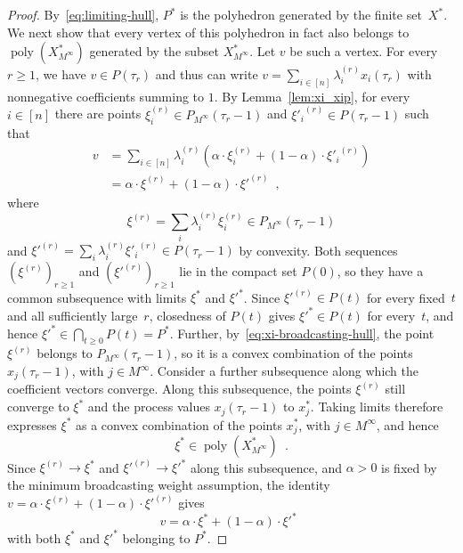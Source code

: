 \documentclass[preprint,12pt,a4paper]{elsarticle}
\theoremstyle{plain}
\theoremstyle{definition}
\renewcommand{\geq}{\geqslant}
\DeclareMathOperator\poly{poly}
\begin{document}
\begin{proof}
\medskip

By~\eqref{eq:limiting-hull}, $P^*$ is the polyhedron generated by
  the finite set~$X^*$.
We next show that every vertex of this polyhedron in fact also belongs to
  $\poly(X_{M^\infty}^*)$ generated by the subset $X_{M^\infty}^*$.
Let $v$ be such a vertex.
For every $r \geq 1$, we have $v \in P(\tau_r)$ and thus can write
  $v = \sum_{i\in[n]}\lambda_i^{(r)}x_i(\tau_r)$ with nonnegative
  coefficients summing to $1$.
By Lemma~\ref{lem:xi_xip}, for every $i \in [n]$ there are points
  $\xi_i^{(r)} \in P_{M^\infty}(\tau_r-1)$ and
  ${\xi'_i}^{(r)} \in P(\tau_r-1)$
  such that
\begin{align*}
	v
	& = \sum_{i\in[n]}\lambda_i^{(r)}
	    \left(
			\alpha\cdot\xi_i^{(r)} + (1-\alpha)\cdot{\xi'_i}^{(r)}
		\right)\\
	& = \alpha\cdot\xi^{(r)} + (1-\alpha)\cdot{\xi'}^{(r)} \enspace,
\end{align*}
where
\begin{equation}\label{eq:xi-broadcasting-hull}
	\xi^{(r)} = \sum_i\lambda_i^{(r)}\xi_i^{(r)} \in P_{M^\infty}(\tau_r-1)
\end{equation}
and
${\xi'}^{(r)} = \sum_i\lambda_i^{(r)}{\xi'_i}^{(r)} \in P(\tau_r-1)$
by convexity.
Both sequences $(\xi^{(r)})_{r \geq 1}$ and $({\xi'}^{(r)})_{r \geq 1}$
  lie in the compact set $P(0)$, so they have a common subsequence
  with limits $\xi^*$ and ${\xi'}^*$.
Since ${\xi'}^{(r)} \in P(t)$ for every fixed~$t$ and all
  sufficiently large~$r$, closedness of $P(t)$ gives ${\xi'}^* \in P(t)$
  for every~$t$, and hence ${\xi'}^* \in \bigcap_{t \geq 0}P(t) = P^*$.
Further, by~\eqref{eq:xi-broadcasting-hull}, the point $\xi^{(r)}$ belongs to
  $P_{M^\infty}(\tau_r-1)$, so it is a convex combination of the points
  $x_j(\tau_r-1)$, with $j \in M^\infty$.
Consider a further subsequence along which the coefficient vectors converge.
Along this subsequence, the points $\xi^{(r)}$ still converge to $\xi^*$
  and the process values $x_j(\tau_r-1)$ to $x_j^*$.
Taking limits therefore expresses $\xi^*$ as a convex combination of the
  points $x_j^*$, with $j \in M^\infty$, and hence
\begin{equation}\label{eq:xi-limit-membership}
	\xi^* \in \poly(X_{M^\infty}^*) \enspace.
\end{equation}
Since $\xi^{(r)} \to \xi^*$ and ${\xi'}^{(r)} \to {\xi'}^*$ along this
  subsequence, and $\alpha > 0$ is fixed by the minimum broadcasting weight
  assumption, the identity
  $v = \alpha\cdot\xi^{(r)} + (1-\alpha)\cdot{\xi'}^{(r)}$ gives
\begin{equation}\label{eq:vertex-limit-decomposition}
	v = \alpha\cdot\xi^* + (1-\alpha)\cdot{\xi'}^* \enspace
\end{equation}
with both $\xi^*$ and ${\xi'}^*$ belonging to $P^*$.


\end{proof}
\end{document}
